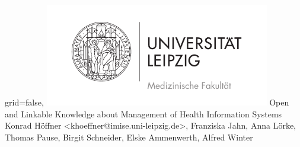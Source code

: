 \documentclass[portrait,final,a0paper,fontscale=0.320]{imiseposter}
\begin{document}


\begin{poster}%
  {grid=false,}
  {\includegraphics[height=4.5cm]{img/medfak.pdf}} 
  {Open and Linkable Knowledge about Management of Health Information Systems}
  {Konrad Höffner {<khoeffner@imise.uni-leipzig.de>}, Franziska Jahn, Anna Lörke, Thomas Pause, Birgit Schneider, Elske
  Ammenwerth, Alfred Winter}
  {%
  }


    \newcommand{\colouredcircle}{%
      \tikz{\useasboundingbox (-0.2em,-0.32em) rectangle(0.2em,0.32em); \draw[draw=black,fill=imiseblue,line width=0.03em] (0,0) circle(0.18em);}}


\end{poster}
\end{document}
